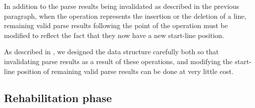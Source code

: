 In addition to the parse results being invalidated as described in the
previous paragraph, when the operation represents the insertion or the
deletion of a line, remaining valid parse results following the point
of the operation must be modified to reflect the fact that they now
have a new start-line position.

As described in , we designed the
data structure carefully both so that invalidating parse results as a
result of these operations, and modifying the start-line position of
remaining valid parse results can be done at very little cost.

\subsection{Rehabilitation phase}
